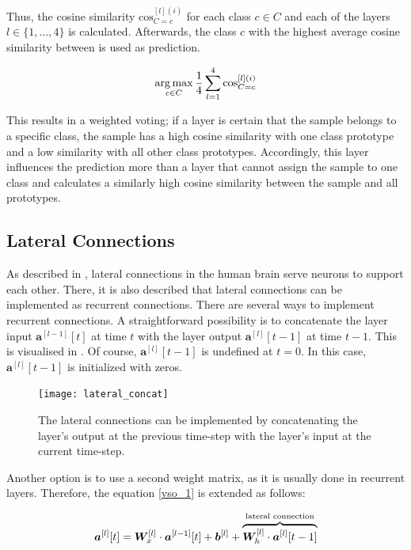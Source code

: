 Thus, the cosine similarity $\text{cos}^{[l](i)}_{C=c}$ for each class $c \in C$ and each of the layers $l \in \{1, ..., 4\}$ is calculated. Afterwards, the class $c$ with the highest average cosine similarity between is used as prediction.

\begin{align}\eqlbl{vso_12}
		\argmax_{c \in C} \frac{1}{4} \sum_{l=1}^{4} \text{cos}^{[l](i)}_{C=c}
\end{align}

This results in a weighted voting; if a layer is certain that the sample belongs to a specific class, the sample has a high cosine similarity with one class prototype and a low similarity with all other class prototypes. Accordingly, this layer influences the prediction more than a layer that cannot assign the sample to one class and calculates a similarly high cosine similarity between the sample and all prototypes.

\subsection{Lateral Connections}
As described in , lateral connections in the human brain serve neurons to support each other.
There, it is also described that lateral connections can be implemented as recurrent connections.
There are several ways to implement recurrent connections. A straightforward possibility is to concatenate the layer input $\boldsymbol{a}^{[l-1]}[t]$ at time $t$ with the layer output $\boldsymbol{a}^{[l]}[t-1]$  at time $t-1$. This is visualised in . Of course, $\boldsymbol{a}^{[l]}[t-1]$ is undefined at $t=0$. In this case, $\boldsymbol{a}^{[l]}[t-1]$ is initialized with zeros.

\begin{figure}[h]
    \centering
    \texttt{[image: lateral\_concat]}
    \caption[Lateral connections by concatenating the layer's output with the layer's input]{The lateral connections can be implemented by concatenating the layer's output at the previous time-step with the layer's input at the current time-step.}
\end{figure}


Another option is to use a second weight matrix, as it is usually done in recurrent layers. Therefore, the equation \eqref{vso_1} is extended as follows:

\begin{align}\eqlbl{vso_13}
		\boldsymbol{a}^{[l]}[t] =  \boldsymbol{W}_x^{[l]} \cdot \boldsymbol{a}^{[l-1]}[t] + \boldsymbol{b}^{[l]} + \overbrace{\boldsymbol{W}_h^{[l]} \cdot \boldsymbol{a}^{[l]}[t-1] }^{\text{lateral connection}}
\end{align}

